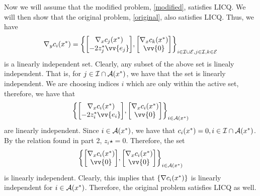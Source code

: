 \begin{solution}
\begin{itemize}
        \hop
        Now we will assume that the modified problem, \ref{modified}, satisfies LICQ. We will then show that the original problem, \ref{original}, also satisfies LICQ. Thus, we have 
        \[\grad_y c_i(x\star) = \left\{ \mqty[\grad_xc_j(x\star)\\-2z_j\star \vv{e_j}],\mqty[\grad_x c_k(x\star)\\\vv{0}]\right\}_{i \in \scI \cup \scE, j \in \scI, k \in \scE}\]
        is a linearly independent set. Clearly, any subset of the above set is linealy independent. That is, for $j \in \mathcal{I} \cap \mathcal{A}(x^*)$, we have that the set is linearly independent. We are choosing indices $i$ which are only within the active set, therefore, we have that 
        \[\left\{ \mqty[\grad_xc_i(x\star)\\-2z_i\star \vv{e_i}],\mqty[\grad_x c_i(x\star)\\\vv{0}]\right\}_{i \in \scA(x\star)}\]
        are linearly independent. Since $i \in \mathcal{A}(x^*)$, we have that $c_i(x^*) = 0, i \in \mathcal{I} \cap \mathcal{A}(x^*)$. By the relation found in part 2, $z_i\star = 0$. Therefore, the set
        \[\left\{ \mqty[\grad_xc_i(x\star)\\\vv{0}],\mqty[\grad_x c_i(x\star)\\\vv{0}]\right\}_{i \in \scA(x\star)}\]
        is linearly independent. Clearly, this implies that $\{ \nabla c_i(x^*)\}$ is linearly independent for $i \in \mathcal{A}(x^*)$. Therefore, the original problem satisfies LICQ as well. 
    \end{itemize}
\end{solution}

\newpage
